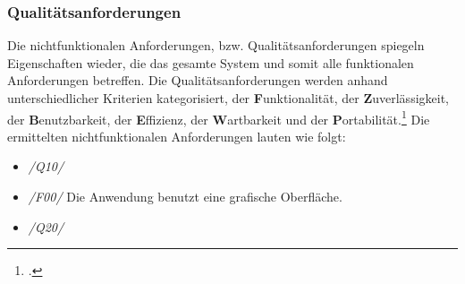 \subsubsection{Qualitätsanforderungen}
Die nichtfunktionalen Anforderungen, bzw. Qualitätsanforderungen spiegeln Eigenschaften wieder, die das gesamte System und somit alle funktionalen Anforderungen betreffen. Die Qualitätsanforderungen werden anhand unterschiedlicher Kriterien kategorisiert, der \textbf{F}unktionalität, der \textbf{Z}uverlässigkeit, der \textbf{B}enutzbarkeit, der \textbf{E}ffizienz, der \textbf{W}artbarkeit und der \textbf{P}ortabilität.\footcite[Vgl.][S. 494 f.]{balzert} Die ermittelten nichtfunktionalen Anforderungen lauten wie folgt:
\begin{itemize}
    \item[] \emph{/Q10/}
    \item[] \emph{/F00/} Die Anwendung benutzt eine grafische Oberfläche.
    \vspace{0.5cm}
    \item[] \emph{/Q20/}
\end{itemize}

